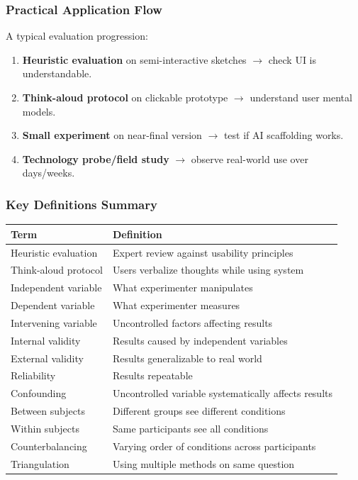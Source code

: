 \subsubsection*{Practical Application Flow}

A typical evaluation progression:
\begin{enumerate}
  \item \textbf{Heuristic evaluation} on semi-interactive sketches $\to$ check UI is understandable.
  \item \textbf{Think-aloud protocol} on clickable prototype $\to$ understand user mental models.
  \item \textbf{Small experiment} on near-final version $\to$ test if AI scaffolding works.
  \item \textbf{Technology probe/field study} $\to$ observe real-world use over days/weeks.
\end{enumerate}

\subsubsection*{Key Definitions Summary}

\begin{center}
\renewcommand{\arraystretch}{1.3}
\begin{tabular}{@{} l p{8cm} @{}}
\toprule
\textbf{Term} & \textbf{Definition} \\
\midrule
Heuristic evaluation & Expert review against usability principles \\
Think-aloud protocol & Users verbalize thoughts while using system \\
Independent variable & What experimenter manipulates \\
Dependent variable & What experimenter measures \\
Intervening variable & Uncontrolled factors affecting results \\
Internal validity & Results caused by independent variables \\
External validity & Results generalizable to real world \\
Reliability & Results repeatable \\
Confounding & Uncontrolled variable systematically affects results \\
Between subjects & Different groups see different conditions \\
Within subjects & Same participants see all conditions \\
Counterbalancing & Varying order of conditions across participants \\
Triangulation & Using multiple methods on same question \\
\bottomrule
\end{tabular}
\end{center}

